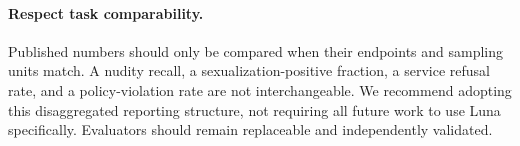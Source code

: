 \documentclass[11pt]{article}
\begin{document}
\paragraph{Respect task comparability.}
Published numbers should only be compared when their endpoints and sampling units match. A nudity recall, a sexualization-positive fraction, a service refusal rate, and a policy-violation rate are not interchangeable. We recommend adopting this disaggregated reporting structure, not requiring all future work to use Luna specifically. Evaluators should remain replaceable and independently validated.
\end{document}
